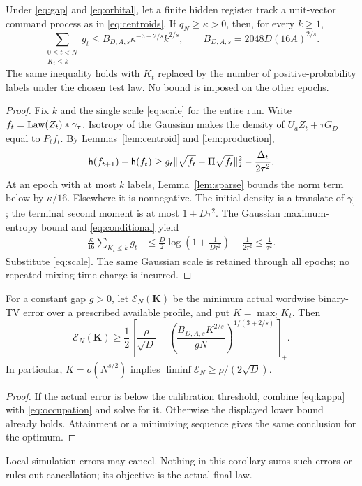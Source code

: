 \begin{theorem}\label{thm:occupation}
Under \eqref{eq:gap} and \eqref{eq:orbital}, let a finite hidden register
track a unit-vector command process as in \eqref{eq:centroids}.
If $q_N\ge\kappa>0$, then, for every $k\ge1$,
\begin{equation}\label{eq:occupation}
 \sum_{\substack{0\le t<N\\K_t\le k}}g_t
 \le B_{D,A,s}\kappa^{-3-2/s}k^{2/s},\qquad
 B_{D,A,s}=2048D(16A)^{2/s}.
\end{equation}
The same inequality holds with $K_t$ replaced by the number of
positive-probability labels under the chosen test law. No bound is
imposed on the other epochs.
\end{theorem}
\begin{proof}
Fix $k$ and the single scale \eqref{eq:scale} for the entire run.
Write $f_t=\operatorname{Law}(Z_t)*\gamma_\tau$. Isotropy of the Gaussian makes the
density of $U_aZ_t+\tau G_D$ equal to $P_tf_t$. By
Lemmas~\ref{lem:centroid} and \ref{lem:production},
\[
 \mathsf h(f_{t+1})-\mathsf h(f_t)
 \ge g_t\lVert\sqrt{f_t}-\Pi\sqrt{f_t}\rVert_2^2
       -\frac{\Delta_t}{2\tau^2}.
\]
At an epoch with at most $k$ labels, Lemma~\ref{lem:sparse} bounds the
norm term below by $\kappa/16$. Elsewhere it is nonnegative.
The initial density is a translate of $\gamma_\tau$; the terminal
second moment is at most $1+D\tau^2$. The Gaussian maximum-entropy
bound and \eqref{eq:conditional} yield
\begin{align*}
 \frac\kappa{16}\sum_{K_t\le k}g_t
 &\le\frac D2\log\left(1+\frac1{D\tau^2}\right)
       +\frac1{2\tau^2}
 \le\frac1{\tau^2}.
\end{align*}
Substitute \eqref{eq:scale}. The same Gaussian scale is retained through
all epochs; no repeated mixing-time charge is incurred.
\end{proof}

\begin{corollary}\label{cor:actual-error}
For a constant gap $g>0$, let $\mathcal E_N(\mathbf K)$ be the minimum
actual wordwise binary-TV error over a prescribed available profile,
and put $K=\max_tK_t$. Then
\begin{equation}\label{eq:actual-error}
 \mathcal E_N(\mathbf K)\ge\frac12
 \left[\frac\rho{\sqrt D}
 -\left(\frac{B_{D,A,s}K^{2/s}}{gN}\right)^{1/(3+2/s)}\right]_+.
\end{equation}
In particular, $K=o(N^{s/2})$ implies
$\liminf\mathcal E_N\ge\rho/(2\sqrt D)$.
\end{corollary}
\begin{proof}
If the actual error is below the calibration threshold, combine
\eqref{eq:kappa} with \eqref{eq:occupation} and solve for it. Otherwise
the displayed lower bound already holds. Attainment or a minimizing
sequence gives the same conclusion for the optimum.
\end{proof}
Local simulation errors may cancel. Nothing in this corollary sums such
errors or rules out cancellation; its objective is the actual final law.
